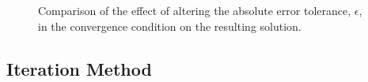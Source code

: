 \begin{figure}
    \centering
    \caption{Comparison of the effect of altering the absolute error tolerance, $\epsilon$, in the convergence condition on the resulting solution.}
    \label{fig:tolerances}
\end{figure}

\subsection{Iteration Method}
\label{subsec:iteration_method}

